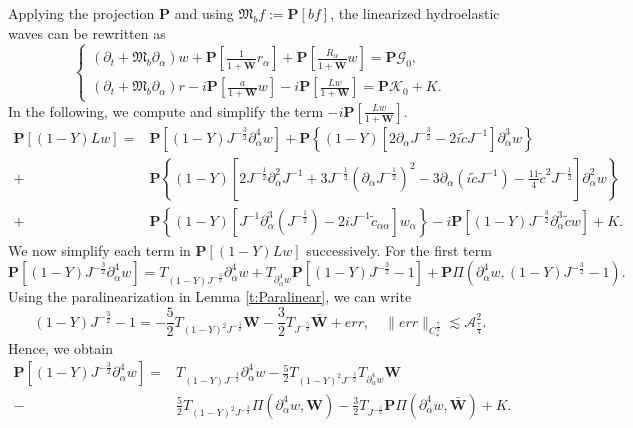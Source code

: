 \documentclass[10pt]{amsart}
\theoremstyle{remark}
\theoremstyle{definition}
\numberwithin{equation}{section}
\newcommand{\p}{\partial}
\newcommand{\al}{\alpha}
\newcommand{\f}{\frac}
\newcommand{\bw}{\mathbf{W}}
\newcommand{\nP}{{\mathbf P}}
\begin{document}
Applying the projection $\nP$ and using $\mathfrak{M}_b f := \nP[b f]$, the linearized hydroelastic waves can be rewritten as
\begin{equation*}
\begin{cases}
(\p_t+ \mathfrak{M}_{b}\p_{\al})w+\nP\left[\f{1}{1+\bar{\mathbf{W}}}r_{\al}\right]+\nP\left[\frac{R_{\al}}{1+\bar{\mathbf{W}}}w\right]=\nP\mathcal{G}_0,\\
(\p_t+\mathfrak{M}_b\p_{\al})r-i\nP\left[\frac{a}{1+\mathbf{W}}w\right]-i\nP\left[\f{Lw}{1+\mathbf{W}}\right]=\nP\mathcal{K}_0+K.
\end{cases}
\end{equation*}
In the following, we compute and simplify the term $-i\nP\left[\f{Lw}{1+\mathbf{W}}\right]$.
\begin{equation*}
\begin{split}
\nP[(1-Y)Lw]
=&\nP[(1-Y)J^{-\f32}\p_{\al}^4w]+\nP \left\{(1-Y)\left[2\p_{\al}J^{-\f32}-2i\tilde{c}J^{-1}\right]\p_{\al}^3w \right\}\\
+&\nP\left\{(1-Y)\left[2J^{-\f12}\p^2_{\al}J^{-1}+3J^{-\f12}(\p_{\al}J^{-\f12})^2-3\p_{\al}(i\tilde{c}J^{-1})-\f{11}{4}\tilde{c}^2J^{-\f12}\right]\p_{\al}^2w \right\}\\
+&\nP \left\{(1-Y)[J^{-1}\p_{\al}^3(J^{-\f12})-2iJ^{-1}\tilde{c}_{\al\al}]w_{\al} \right\}-i\nP\left[(1-Y)J^{-\f32}\p_{\al}^3\tilde{c}w\right]+K.
\end{split}
\end{equation*}
We now simplify each term in $\nP[(1-Y)Lw]$ successively. 
For the first term
\begin{equation*}
\nP[(1-Y)J^{-\f32}\p_{\al}^4w]=T_{(1-Y)J^{-\f32}}\p_{\al}^4w+T_{\p_{\al}^4w}\nP[(1-Y)J^{-\f32}-1]+\nP\Pi(\p^4_{\al}w,(1-Y)J^{-\f32}-1).
\end{equation*}
Using the paralinearization in Lemma \ref{t:Paralinear}, we can write
\begin{equation*}
 (1-Y)J^{-\f32}-1 = -\f52T_{(1-Y)^2J^{-\f32}} \bw -\f32 T_{J^{-\f52}}\bar{\bw} + err, \quad \|err\|_{C_*^\f72}  \lesssim \mathcal{A}^2_{\f74}.
\end{equation*}
Hence, we obtain
\begin{align*}
 \nP[(1-Y)J^{-\f32}\p_{\al}^4w]=&T_{(1-Y)J^{-\f32}}\p_{\al}^4w  -\f52T_{(1-Y)^2J^{-\f32}}T_{\p_{\al}^4w} \bw  \\
 -&\f52T_{(1-Y)^2J^{-\f32}}\Pi(\p_{\al}^4w, \bw)  -\f32  T_{J^{-\f52}}\nP \Pi(\p^4_{\al}w,\bar{\bw}) + K.
\end{align*}
\end{document}
